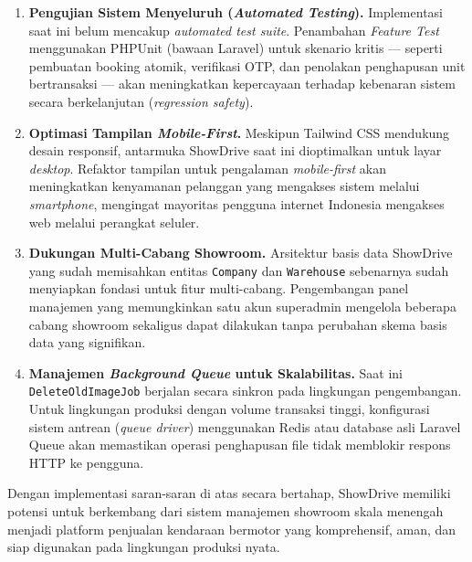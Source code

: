 \documentclass[11pt, a5paper]{article}
\begin{document}
\begin{enumerate}[label=\arabic*.]
  \item \textbf{Pengujian Sistem Menyeluruh (\textit{Automated Testing}).}
        Implementasi saat ini belum mencakup \textit{automated test suite}.
        Penambahan \textit{Feature Test} menggunakan PHPUnit (bawaan Laravel)
        untuk skenario kritis — seperti pembuatan booking atomik, verifikasi OTP,
        dan penolakan penghapusan unit bertransaksi — akan meningkatkan
        kepercayaan terhadap kebenaran sistem secara berkelanjutan
        (\textit{regression safety}).

  \item \textbf{Optimasi Tampilan \textit{Mobile-First}.}
        Meskipun Tailwind CSS mendukung desain responsif, antarmuka ShowDrive
        saat ini dioptimalkan untuk layar \textit{desktop}. Refaktor tampilan
        untuk pengalaman \textit{mobile-first} akan meningkatkan kenyamanan
        pelanggan yang mengakses sistem melalui \textit{smartphone}, mengingat
        mayoritas pengguna internet Indonesia mengakses web melalui perangkat
        seluler.

  \item \textbf{Dukungan Multi-Cabang Showroom.}
        Arsitektur basis data ShowDrive yang sudah memisahkan entitas
        \texttt{Company} dan \texttt{Warehouse} sebenarnya sudah menyiapkan
        fondasi untuk fitur multi-cabang. Pengembangan panel manajemen yang
        memungkinkan satu akun superadmin mengelola beberapa cabang showroom
        sekaligus dapat dilakukan tanpa perubahan skema basis data yang signifikan.

  \item \textbf{Manajemen \textit{Background Queue} untuk Skalabilitas.}
        Saat ini \texttt{DeleteOldImageJob} berjalan secara sinkron pada
        lingkungan pengembangan. Untuk lingkungan produksi dengan volume
        transaksi tinggi, konfigurasi sistem antrean (\textit{queue driver})
        menggunakan Redis atau database asli Laravel Queue akan memastikan
        operasi penghapusan file tidak memblokir respons HTTP ke pengguna.
\end{enumerate}

Dengan implementasi saran-saran di atas secara bertahap, ShowDrive memiliki
potensi untuk berkembang dari sistem manajemen showroom skala menengah menjadi
platform penjualan kendaraan bermotor yang komprehensif, aman, dan siap
digunakan pada lingkungan produksi nyata.

\newpage

\end{document}
